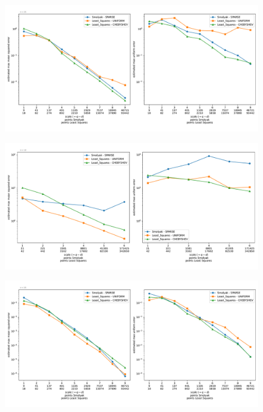 \documentclass[12pt, oneside]{amsart}
\theoremstyle{definition}
\theoremstyle{remark}
\numberwithin{equation}{section}
\begin{document}

\begin{figure}[h]
	\centering
	\includegraphics[width=\linewidth]{figures/g_function/dim4/max_error_distribution_fixed_dim}
	\caption{}
	\label{fig:g_function_dim4}
\end{figure}

\begin{figure}[h]
	\centering
	\includegraphics[width=\linewidth]{figures/g_function/dim10/max_error_distribution_fixed_dim}
	\caption{}
	\label{fig:g_function_dim10}
\end{figure}


\begin{figure}[h]
	\centering
	\includegraphics[width=\linewidth]{figures/morokoff_calfisch1/dim4/max_error_distribution_fixed_dim}
	\caption{}
	\label{fig:morokoff_calfisch1_dim4}
\end{figure}
\end{document}
